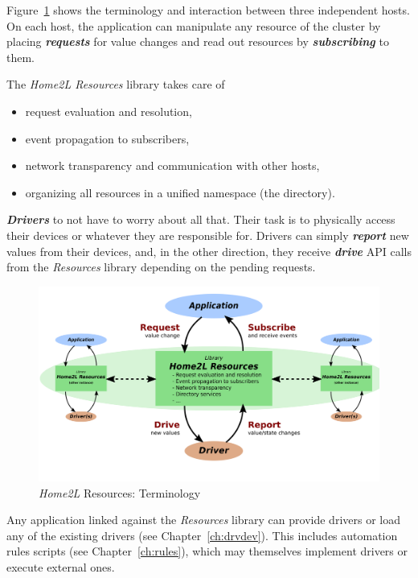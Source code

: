 \documentclass[12pt,english,parskip=half]{scrreprt}
\newcommand{\figfile}[2]{#2}             %
\newcommand{\figfile}[2]{\href{#1}{#2}}  %
\begin{document}
Figure~\ref{fig:resources-terminology} shows the terminology and interaction
between three independent hosts. On each host, the application can manipulate
any resource of the cluster by placing \textbf{\emph{requests}} for value changes
and read out resources by \textbf{\emph{subscribing}} to them.

The \emph{Home2L Resources} library takes care of
\begin{itemize}
  \item request evaluation and resolution,
  \item event propagation to subscribers,
  \item network transparency and communication with other hosts,
  \item organizing all resources in a unified namespace (the directory).
\end{itemize}

\textbf{\emph{Drivers}} to not have to worry about all that. Their task is to physically
access their devices or whatever they are responsible for.
Drivers can simply \textbf{\emph{report}} new values from their devices, and, in the other
direction, they receive \textbf{\emph{drive}} API calls from the \emph{Resources} library
depending on the pending requests.

\begin{figure}[ht]
  \centering
  \figfile{figs/resources-terminology.svg}{
    \includegraphics[width=\linewidth,keepaspectratio]{figs/resources-terminology}   %
  }
  \caption[l]{\emph{Home2L} Resources: Terminology}
  \label{fig:resources-terminology}
\end{figure}

Any application linked against the \emph{Resources} library can provide drivers or
load any of the existing drivers (see Chapter~\ref{ch:drvdev}). This includes
automation rules scripts (see Chapter~\ref{ch:rules}), which may themselves implement
drivers or execute external ones.
\end{document}
